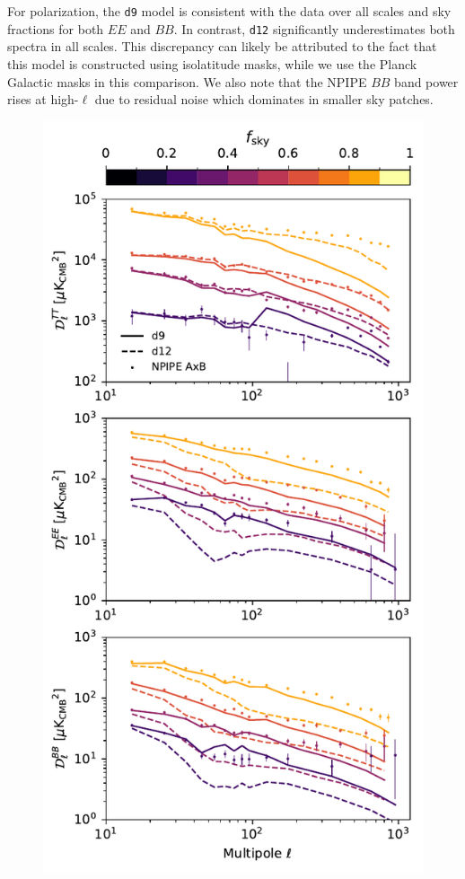 \documentclass[twocolumn]{aastex631}
\begin{document}
For polarization, the \texttt{d9} model is consistent with the data over all scales and sky fractions for both $EE$ and $BB$. In contrast, \texttt{d12} significantly underestimates both spectra in all scales. This discrepancy can likely be attributed to the fact that this model is constructed using isolatitude masks, while we use the Planck Galactic masks in this comparison. We also note that the NPIPE $BB$ band power rises at high-$\ell$ due to residual noise which dominates in smaller sky patches.

\begin{figure}
    \centering
    \includegraphics[width=\columnwidth]{figures/largefield_power_all_TEB_pub.pdf}

\end{figure}
\end{document}
